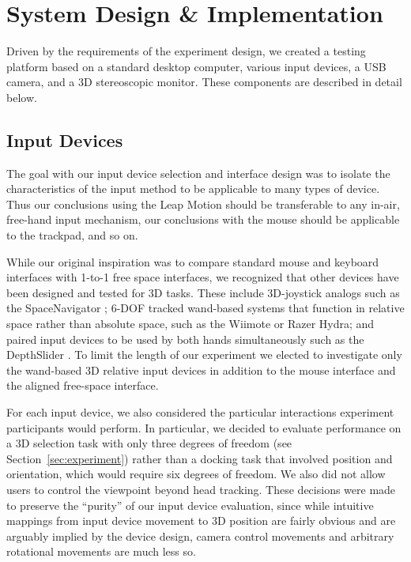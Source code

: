 \section{System Design \& Implementation}\label{sec:design}

Driven by the requirements of the experiment design, we created a testing
platform based on a standard desktop computer, various input devices, a USB
camera, and a 3D stereoscopic monitor.  These components are described in
detail below.

\subsection{Input Devices}
The goal with our input device selection and interface design was to isolate
the characteristics of the input method to be applicable to many types of
device.  Thus our conclusions using the Leap Motion should be transferable to
any in-air, free-hand input mechanism, our conclusions with the mouse should
be applicable to the trackpad, and so on.

While our original inspiration was to compare standard mouse and keyboard
interfaces with 1-to-1 free space interfaces, we recognized that other devices
have been designed and tested for 3D tasks. These include 3D-joystick analogs
such as the SpaceNavigator \cite{mattheiss2011navigating}; 6-DOF tracked
wand-based systems that function in relative space rather than absolute space,
such as the Wiimote or Razer Hydra; and paired input devices to be used by both
hands simultaneously such as the DepthSlider \cite{study1}. To limit the length
of our experiment we elected to investigate only the wand-based 3D relative
input devices in addition to the mouse interface and the aligned free-space
interface.

For each input device, we also considered the particular interactions
experiment participants would perform. In particular, we decided to evaluate
performance on a 3D selection task with only three degrees of freedom (see
Section~\ref{sec:experiment}) rather than a docking task that involved
position and orientation, which would require six degrees of freedom. We also
did not allow users to control the viewpoint beyond head tracking. These
decisions were made to preserve the ``purity'' of our input device evaluation,
since while intuitive mappings from input device movement to 3D position are
fairly obvious and are arguably implied by the device design, camera control
movements and arbitrary rotational movements are much less so.

